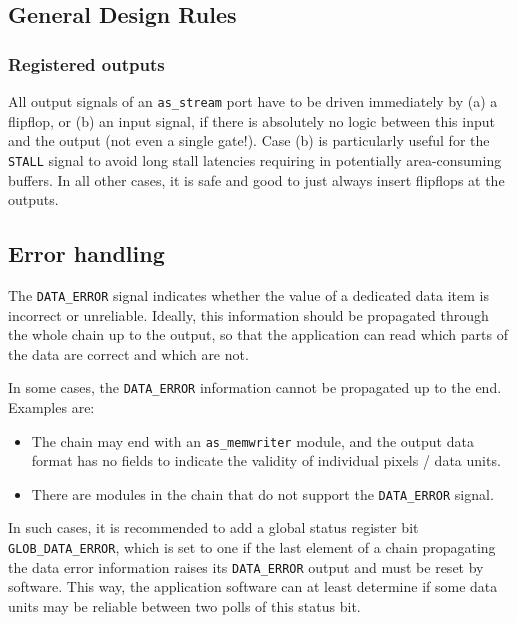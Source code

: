 \subsection{General Design Rules}

\subsubsection{Registered outputs}

All output signals of an \texttt{as\_stream} port have to be driven immediately by (a) a flipflop, or (b) an input signal, if there is absolutely no logic between this input and the output (not even a single gate!). Case (b) is particularly useful for the \texttt{STALL} signal to avoid long stall latencies requiring in potentially area-consuming buffers. In all other cases, it is safe and good to just always insert flipflops at the outputs.




\subsection{Error handling} \label{ch:05-03-interfaces-as_stream-error_handling}

The \texttt{DATA\_ERROR} signal indicates whether the value of a dedicated data item is incorrect or unreliable. Ideally, this information should be propagated through the whole chain up to the output, so that the application can read which parts of the data are correct and which are not.

In some cases, the \texttt{DATA\_ERROR} information cannot be propagated up to the end. Examples are: 
\begin{itemize}
\item The chain may end with an \texttt{as\_memwriter} module, and the output data format has no fields to indicate the validity of individual pixels / data units.
\item There are modules in the chain that do not support the \texttt{DATA\_ERROR} signal.
\end{itemize}
In such cases, it is recommended to add a global status register bit \texttt{GLOB\_DATA\_ERROR}, which is set to one if the last element of a chain propagating the data error information raises its \texttt{DATA\_ERROR} output and must be reset by software. This way, the application software can at least determine if some data units may be reliable between two polls of this status bit.



